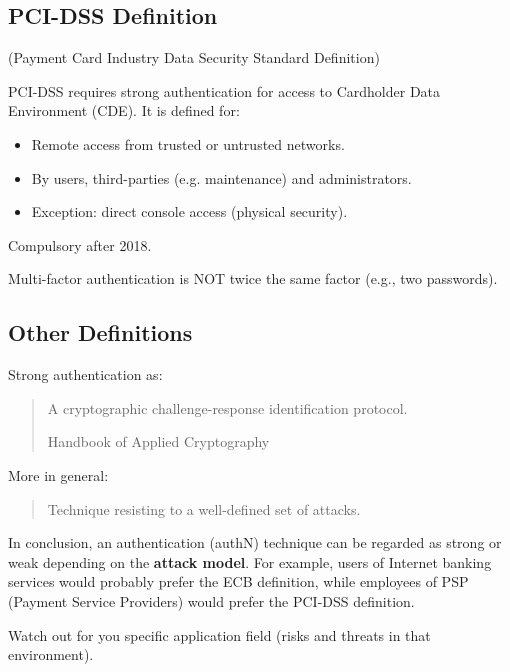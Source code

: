 \subsection*{PCI-DSS Definition}
\begin{center}
    (Payment Card Industry Data Security Standard Definition)
\end{center}
PCI-DSS requires strong authentication for access to Cardholder Data Environment (CDE). It is defined for:
\begin{itemize}
    \item Remote access from trusted or untrusted networks.
    \item By users, third-parties (e.g. maintenance) and administrators.
    \item Exception: direct console access (physical security).
\end{itemize}
Compulsory after 2018.
\begin{tcolorbox}[colback=red!10!white, colframe=red!70!black, coltitle=white, title=Beware]
Multi-factor authentication is NOT twice the same factor (e.g., two passwords).
\end{tcolorbox}

\subsection*{Other Definitions}
Strong authentication as:

\vspace{0.3cm}

\blockquote[Handbook of Applied Cryptography]{A cryptographic challenge-response identification protocol.}

\vspace{0.3cm}

\noindent More in general:

\blockquote{Technique resisting to a well-defined set of attacks.}

\vspace{0.3cm}


In conclusion, an authentication (authN) technique can be regarded as strong or weak depending on the \textbf{attack model}. For example, users of Internet banking services would probably prefer the ECB definition, while employees of PSP (Payment Service Providers) would prefer the PCI-DSS definition.

\begin{tcolorbox}[colback=blue!10!white, colframe=blue!50!white]
Watch out for you specific application field (risks and threats in that environment).
\end{tcolorbox}

